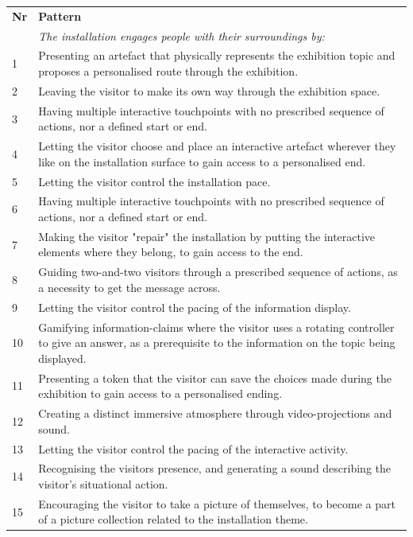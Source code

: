 \begin{table}[h]
\centering
\begin{tabular}{| p{1cm} | p{11cm}| }
\hline
\textbf{Nr} & \textbf{Pattern} \\
& \textit{The installation engages people with their surroundings by: }\\
\hline
1 & Presenting an artefact that physically represents the exhibition topic and proposes a personalised route through the exhibition. \\
\hline
2 & Leaving the visitor to make its own way through the exhibition space. \\
\hline
3 & Having multiple interactive touchpoints with no prescribed sequence of actions, nor a defined start or end. \\
\hline
4 & Letting the visitor choose and place an interactive artefact wherever they like on the installation surface to gain access to a personalised end. \\
\hline
5 & Letting the visitor control the installation pace. \\
\hline
6 & Having multiple interactive touchpoints with no prescribed sequence of actions, nor a defined start or end. \\
\hline
7 & Making the visitor "repair" the installation by putting the interactive elements where they belong, to gain access to the end. \\
\hline
8 & Guiding two-and-two visitors through a prescribed sequence of actions, as a necessity to get the message across.  \\
\hline
9 & Letting the visitor control the pacing of the information display. \\
\hline
10 & Gamifying information-claims where the visitor uses a rotating controller to give an answer, as a prerequisite to the information on the topic being displayed. \\
\hline
11 & Presenting a token that the visitor can save the choices made during the exhibition to gain access to a personalised ending. \\
\hline
12 & Creating a distinct immersive atmosphere through video-projections and sound. \\
\hline
13 & Letting the visitor control the pacing of the interactive activity. \\
\hline
14 & Recognising the visitors presence, and generating a sound describing the visitor's situational action. \\
\hline
15 & Encouraging the visitor to take a picture of themselves, to become a part of a picture collection related to the installation theme.  \\

\end{tabular}
\end{table}
